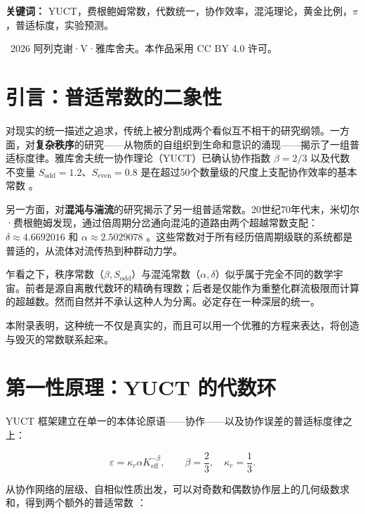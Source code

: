 \documentclass[12pt,a4paper]{article}
\begin{document}
	\vspace{1cm}
	\noindent
	\small\textbf{关键词：} YUCT，费根鲍姆常数，代数统一，协作效率，混沌理论，黄金比例，\(\pi\)，普适标度，实验预测。
	
	\vspace{0.5cm}
	\noindent
	\textcopyright\ 2026 阿列克谢·V·雅库舍夫。本作品采用 CC BY 4.0 许可。
	
	\tableofcontents
	\newpage
	
	\section{引言：普适常数的二象性}
	
	对现实的统一描述之追求，传统上被分割成两个看似互不相干的研究纲领。一方面，对\textbf{复杂秩序}的研究——从物质的自组织到生命和意识的涌现——揭示了一组普适标度律。雅库舍夫统一协作理论（YUCT）已确认协作指数 \(\beta = 2/3\) 以及代数不变量 \(S_{\mathrm{odd}} = 1.2\)、\(S_{\mathrm{even}} = 0.8\) 是在超过50个数量级的尺度上支配协作效率的基本常数 \cite{Yakushev2026, AppendixAF}。
	
	另一方面，对\textbf{混沌与湍流}的研究揭示了另一组普适常数。20世纪70年代末，米切尔·费根鲍姆发现，通过倍周期分岔通向混沌的道路由两个超越常数支配：\(\delta \approx 4.6692016\) 和 \(\alpha \approx 2.5029078\) \cite{Feigenbaum1978}。这些常数对于所有经历倍周期级联的系统都是普适的，从流体对流传热到种群动力学。
	
	乍看之下，秩序常数（\(\beta, S_{\mathrm{odd}}\)）与混沌常数（\(\alpha, \delta\)）似乎属于完全不同的数学宇宙。前者是源自离散代数环的精确有理数；后者是仅能作为重整化群流极限而计算的超越数。然而自然并不承认这种人为分离。必定存在一种深层的统一。
	
	本附录表明，这种统一不仅是真实的，而且可以用一个优雅的方程来表达，将创造与毁灭的常数联系起来。
	
	\section{第一性原理：YUCT 的代数环}
	
	YUCT 框架建立在单一的本体论原语——协作——以及协作误差的普适标度律之上：
	
	\begin{equation}
		\varepsilon = \kappa_c \alpha K_{\mathrm{eff}}^{-\beta}, \qquad \beta = \frac{2}{3}, \quad \kappa_c = \frac{1}{3}.
	\end{equation}
	
	从协作网络的层级、自相似性质出发，可以对奇数和偶数协作层上的几何级数求和，得到两个额外的普适常数 \cite{AppendixFerra}：
	
\end{document}
